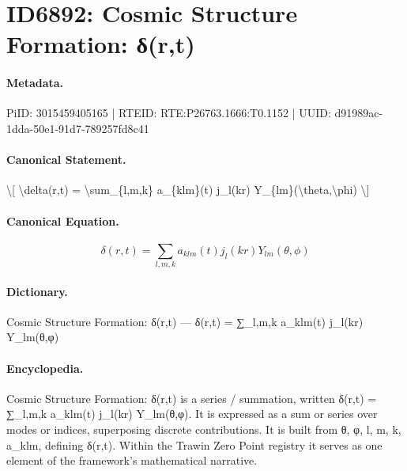 \section*{ID6892: Cosmic Structure Formation: δ(r,t)}
\paragraph{Metadata.}
PiID: 3015459405165 | RTEID: RTE:P26763.1666:T0.1152 | UUID: d91989ac-1dda-50e1-91d7-789257fd8c41

\paragraph{Canonical Statement.}
\textbackslash{}[ \textbackslash{}delta(r,t) = \textbackslash{}sum\_\{l,m,k\} a\_\{klm\}(t) j\_l(kr) Y\_\{lm\}(\textbackslash{}theta,\textbackslash{}phi) \textbackslash{}]

\paragraph{Canonical Equation.}
\[
\delta(r,t) = \sum_{l,m,k} a_{klm}(t) j_l(kr) Y_{lm}(\theta,\phi)
\]

\paragraph{Dictionary.}
Cosmic Structure Formation: δ(r,t) — δ(r,t) = ∑\_l,m,k a\_klm(t) j\_l(kr) Y\_lm(θ,φ)

\paragraph{Encyclopedia.}
Cosmic Structure Formation: δ(r,t) is a series / summation, written δ(r,t) = ∑\_l,m,k a\_klm(t) j\_l(kr) Y\_lm(θ,φ). It is expressed as a sum or series over modes or indices, superposing discrete contributions. It is built from θ, φ, l, m, k, a\_klm, defining δ(r,t). Within the Trawin Zero Point registry it serves as one element of the framework's mathematical narrative.
